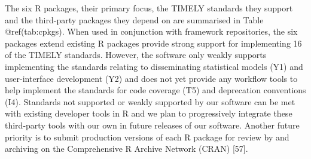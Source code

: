 \documentclass[
]{article}
\begin{document}
The six R packages, their primary focus, the TIMELY standards they support and the third-party packages they depend on are summarised in Table @ref(tab:cpkgs). When used in conjunction with framework repositories, the six packages extend existing R packages provide strong support for implementing 16 of the TIMELY standards. However, the software only weakly supports implementing the standards relating to disseminating statistical models (Y1) and user-interface development (Y2) and does not yet provide any workflow tools to help implement the standards for code coverage (T5) and deprecation conventions (I4). Standards not supported or weakly supported by our software can be met with existing developer tools in R and we plan to progressively integrate these third-party tools with our own in future releases of our software. Another future priority is to submit production versions of each R package for review by and archiving on the Comprehensive R Archive Network (CRAN) {[}57{]}.
\end{document}
